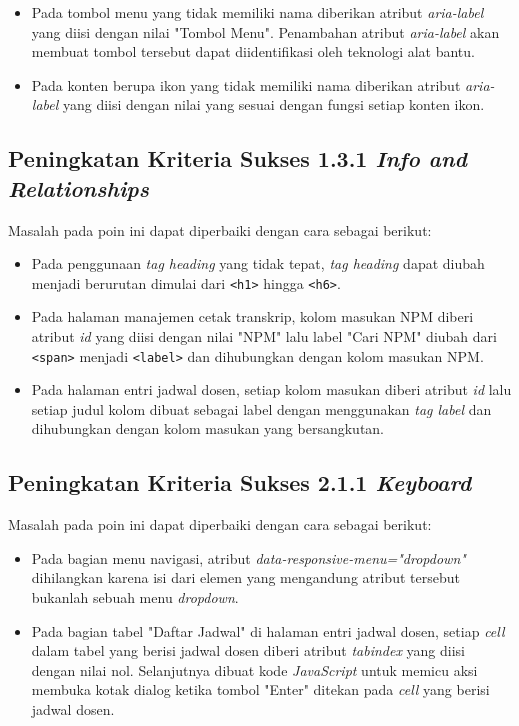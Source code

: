 \begin{itemize}
    \item Pada tombol menu yang tidak memiliki nama diberikan atribut \textit{aria-label} yang diisi dengan nilai "Tombol Menu". Penambahan atribut \textit{aria-label} akan membuat tombol tersebut dapat diidentifikasi oleh teknologi alat bantu.
    \item Pada konten berupa ikon yang tidak memiliki nama diberikan atribut \textit{aria-label} yang diisi dengan nilai yang sesuai dengan fungsi setiap konten ikon.
\end{itemize}

\subsection{Peningkatan Kriteria Sukses 1.3.1 \textit{Info and Relationships}}
\label{subsec:peningkatan_kriteria_sukses_1.3.1}
Masalah pada poin ini dapat diperbaiki dengan cara sebagai berikut:

\begin{itemize}
    \item Pada penggunaan \textit{tag heading} yang tidak tepat, \textit{tag heading} dapat diubah menjadi berurutan dimulai dari \texttt{<h1>} hingga \texttt{<h6>}.
    \item Pada halaman manajemen cetak transkrip, kolom masukan NPM diberi atribut \textit{id} yang diisi dengan nilai "NPM" lalu label "Cari NPM" diubah dari \texttt{<span>} menjadi \texttt{<label>} dan dihubungkan dengan kolom masukan NPM.
    \item Pada halaman entri jadwal dosen, setiap kolom masukan diberi atribut \textit{id} lalu setiap judul kolom dibuat sebagai label dengan menggunakan \textit{tag label} dan dihubungkan dengan kolom masukan yang bersangkutan.
\end{itemize}

\subsection{Peningkatan Kriteria Sukses 2.1.1 \textit{Keyboard}}
\label{subsec:peningkatan_kriteria_sukses_2.1.1}
Masalah pada poin ini dapat diperbaiki dengan cara sebagai berikut:

\begin{itemize}
    \item Pada bagian menu navigasi, atribut \textit{data-responsive-menu="dropdown"} dihilangkan karena isi dari elemen yang mengandung atribut tersebut bukanlah sebuah menu \textit{dropdown}.
    \item Pada bagian tabel "Daftar Jadwal" di halaman entri jadwal dosen, setiap \textit{cell} dalam tabel yang berisi jadwal dosen diberi atribut \textit{tabindex} yang diisi dengan nilai nol. Selanjutnya dibuat kode \textit{JavaScript} untuk memicu aksi membuka kotak dialog ketika tombol "Enter" ditekan pada \textit{cell} yang berisi jadwal dosen.
\end{itemize}

